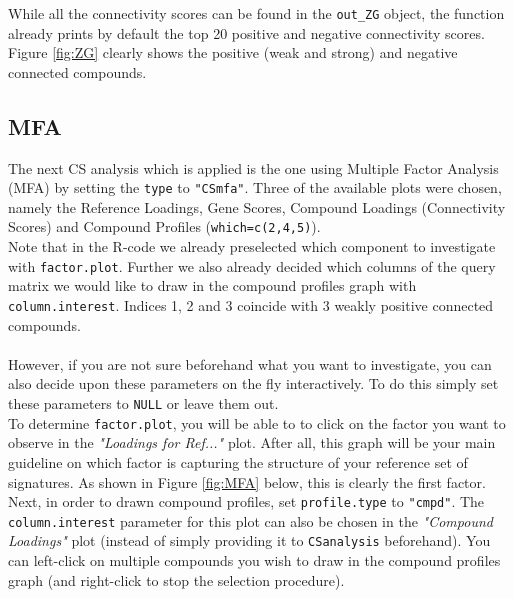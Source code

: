 \documentclass[a4paper]{article}\usepackage[]{graphicx}\usepackage[]{color}
\begin{document}
\noindent While all the connectivity scores can be found in the \texttt{out\_ZG}
object, the function already prints by default the top 20 positive and negative
connectivity scores. Figure \ref{fig:ZG} clearly shows the positive (weak and
strong) and negative connected compounds.

\subsection{MFA}
The next CS analysis which is applied is the one using Multiple Factor Analysis
(MFA) by setting the \texttt{type} to \texttt{"CSmfa"}. Three of the
available plots were chosen, namely the Reference Loadings, Gene Scores,
Compound Loadings (Connectivity Scores) and Compound Profiles
(\texttt{which=c(2,4,5)}).\\
Note that in the R-code we already preselected which component to investigate
with \texttt{factor.plot}.
Further we also already decided which columns of the query matrix we would like
to draw in the compound profiles graph with \texttt{column.interest}. Indices 1, 2 and 3 coincide
with 3 weakly positive connected compounds.\\ \\
However, if you are not sure beforehand what you want to investigate, you can
also decide upon these parameters on the fly interactively. To do this simply
set these parameters to \texttt{NULL} or leave them out.\\
To determine \texttt{factor.plot}, you will be able to to click on the factor
you want to observe in the {\it "Loadings for Ref..."} plot. After all, this graph will be
your main guideline on which factor is capturing the structure of your reference
set of signatures. As shown in Figure \ref{fig:MFA} below, this is clearly the
first factor. \\
Next, in order to drawn compound profiles, set \texttt{profile.type} to
\texttt{"cmpd"}. The \texttt{column.interest} parameter for this plot can also
be chosen in the {\it "Compound Loadings"} plot (instead of simply providing it
to \texttt{CSanalysis} beforehand). You can left-click on multiple compounds you wish to draw in the compound profiles graph (and right-click to stop the selection procedure). 
\end{document}
